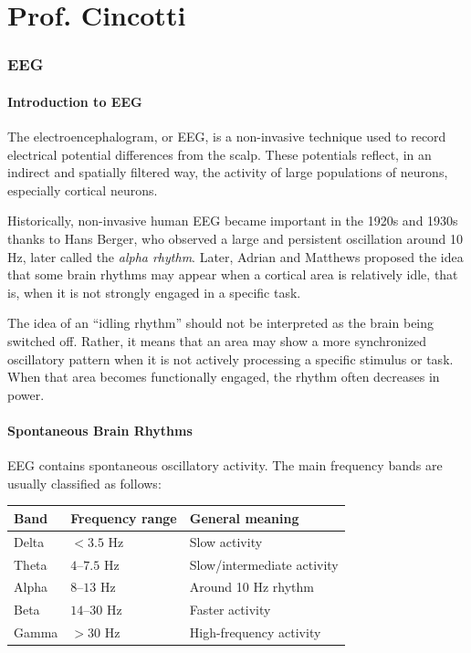 
\part{Prof. Cincotti}

\section{EEG}

\subsection{Introduction to EEG}

The electroencephalogram, or EEG, is a non-invasive technique used to record electrical potential differences from the scalp. These potentials reflect, in an indirect and spatially filtered way, the activity of large populations of neurons, especially cortical neurons.

Historically, non-invasive human EEG became important in the 1920s and 1930s thanks to Hans Berger, who observed a large and persistent oscillation around 10 Hz, later called the \textit{alpha rhythm}. Later, Adrian and Matthews proposed the idea that some brain rhythms may appear when a cortical area is relatively idle, that is, when it is not strongly engaged in a specific task.

\begin{authornote}
The idea of an ``idling rhythm'' should not be interpreted as the brain being switched off. Rather, it means that an area may show a more synchronized oscillatory pattern when it is not actively processing a specific stimulus or task. When that area becomes functionally engaged, the rhythm often decreases in power.
\end{authornote}

\subsection{Spontaneous Brain Rhythms}

EEG contains spontaneous oscillatory activity. The main frequency bands are usually classified as follows:

\begin{center}
\begin{tabular}{lll}
\toprule
\textbf{Band} & \textbf{Frequency range} & \textbf{General meaning} \\
\midrule
Delta & $< 3.5$ Hz & Slow activity \\
Theta & $4$--$7.5$ Hz & Slow/intermediate activity \\
Alpha & $8$--$13$ Hz & Around 10 Hz rhythm \\
Beta & $14$--$30$ Hz & Faster activity \\
Gamma & $> 30$ Hz & High-frequency activity \\
\bottomrule
\end{tabular}
\end{center}

